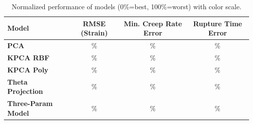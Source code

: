 \documentclass{article}
\begin{document}
	
	\def\rmsePCA{0.002683}
	\def\rmseRBF{0.002808}
	\def\rmsePoly{0.009904}
	\def\rmseTheta{0.000004}
	\def\rmseThree{0.000007}
	
	\def\creepPCA{5.3e-8}
	\def\creepRBF{6.22e-8}
	\def\creepPoly{1.76e-7}
	\def\creepTheta{1.54e-8}
	\def\creepThree{4.84e-8}
	
	\def\rupturePCA{546}
	\def\ruptureRBF{546}
	\def\rupturePoly{545}
	\def\ruptureTheta{999}  %
	\def\ruptureThree{999}
	
	\def\minRMSE{0.000004}
	\def\maxRMSE{0.009904}
	
	\def\minCreep{1.54e-8}
	\def\maxCreep{1.76e-7}
	
	\def\minRupture{545}
	\def\maxRupture{999}
	
	\newcommand{\normalize}[3]{%
		\pgfmathparse{(#1 - #2)/(#3 - #2)}%
		\pgfmathresult%
	}
	
	\newcommand{\colcell}[1]{%
		\pgfmathparse{round(#1*100)}%
		\edef\percent{\pgfmathresult}%
		\cellcolor{red!\percent!green!40}\percent\%
	}
	

	
	\begin{table}[h]
		\centering
		\caption{Normalized performance of models (0\%=best, 100\%=worst) with color scale.}
		\begin{tabular}{lccc}
			\toprule
			\textbf{Model} & \textbf{RMSE (Strain)} & \textbf{Min. Creep Rate Error} & \textbf{Rupture Time Error} \\
			\midrule
			
			\textbf{PCA} &
			\colcell{\normalize{\rmsePCA}{\minRMSE}{\maxRMSE}} &
			\colcell{\normalize{\creepPCA}{\minCreep}{\maxCreep}} &
			\colcell{\normalize{\rupturePCA}{\minRupture}{\maxRupture}} \\
			
			\textbf{KPCA RBF} &
			\colcell{\normalize{\rmseRBF}{\minRMSE}{\maxRMSE}} &
			\colcell{\normalize{\creepRBF}{\minCreep}{\maxCreep}} &
			\colcell{\normalize{\ruptureRBF}{\minRupture}{\maxRupture}} \\
			
			\textbf{KPCA Poly} &
			\colcell{\normalize{\rmsePoly}{\minRMSE}{\maxRMSE}} &
			\colcell{\normalize{\creepPoly}{\minCreep}{\maxCreep}} &
			\colcell{\normalize{\rupturePoly}{\minRupture}{\maxRupture}} \\
			
			\textbf{Theta Projection} &
			\colcell{\normalize{\rmseTheta}{\minRMSE}{\maxRMSE}} &
			\colcell{\normalize{\creepTheta}{\minCreep}{\maxCreep}} &
			\colcell{\normalize{\ruptureTheta}{\minRupture}{\maxRupture}} \\
			
			\textbf{Three-Param Model} &
			\colcell{\normalize{\rmseThree}{\minRMSE}{\maxRMSE}} &
			\colcell{\normalize{\creepThree}{\minCreep}{\maxCreep}} &
			\colcell{\normalize{\ruptureThree}{\minRupture}{\maxRupture}} \\
			
			\bottomrule
		\end{tabular}
		\label{tab:model_heatmap_normalized}
	\end{table}
\end{document}
